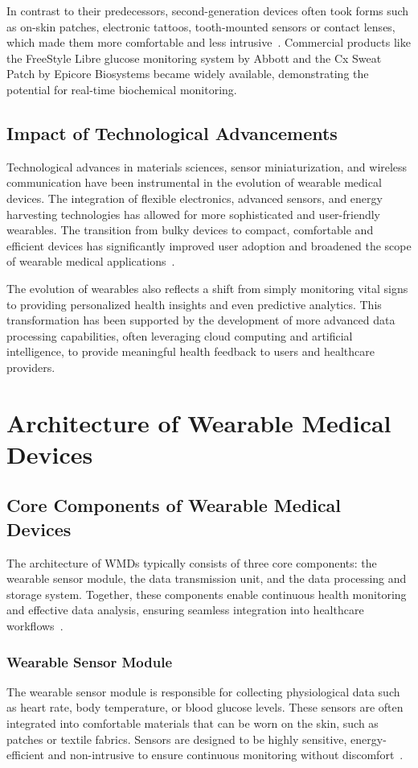 \documentclass[journal]{IEEEtran}
\begin{document}
    In contrast to their predecessors, second-generation devices often took forms such as on-skin patches, electronic tattoos, tooth-mounted sensors or contact lenses, which made them more comfortable and less intrusive~\cite{Ates2022}. Commercial products like the FreeStyle Libre glucose monitoring system by Abbott and the Cx Sweat Patch by Epicore Biosystems became widely available, demonstrating the potential for real-time biochemical monitoring.

    \subsection{Impact of Technological Advancements}

    Technological advances in materials sciences, sensor miniaturization, and wireless communication have been instrumental in the evolution of wearable medical devices. The integration of flexible electronics, advanced sensors, and energy harvesting technologies has allowed for more sophisticated and user-friendly wearables. The transition from bulky devices to compact, comfortable and efficient devices has significantly improved user adoption and broadened the scope of wearable medical applications~\cite{Ates2022}.

    The evolution of wearables also reflects a shift from simply monitoring vital signs to providing personalized health insights and even predictive analytics. This transformation has been supported by the development of more advanced data processing capabilities, often leveraging cloud computing and artificial intelligence, to provide meaningful health feedback to users and healthcare providers.

\section{Architecture of Wearable Medical Devices}
\label{4.Architecture}
    \subsection{Core Components of Wearable Medical Devices}
    The architecture of WMDs typically consists of three core components: the wearable sensor module, the data transmission unit, and the data processing and storage system. Together, these components enable continuous health monitoring and effective data analysis, ensuring seamless integration into healthcare workflows~\cite{Ates2022}.
    
        \subsubsection{Wearable Sensor Module}
        The wearable sensor module is responsible for collecting physiological data such as heart rate, body temperature, or blood glucose levels. These sensors are often integrated into comfortable materials that can be worn on the skin, such as patches or textile fabrics. Sensors are designed to be highly sensitive, energy-efficient and non-intrusive to ensure continuous monitoring without discomfort~\cite{Saifuzzaman2021}.
        
\end{document}
